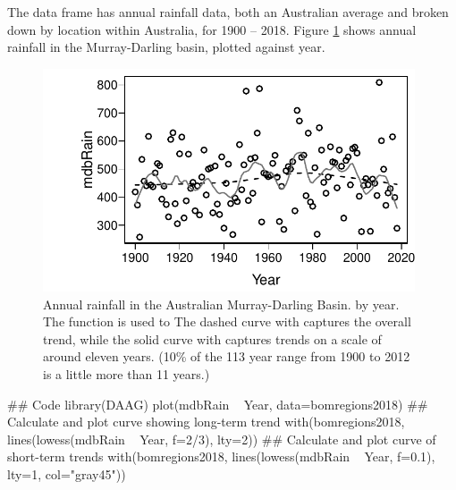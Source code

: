 The data frame  has
annual rainfall data, both an Australian average and broken down by
location within Australia, for 1900 -- 2018.
Figure \ref{fig:mdbRain} shows annual rainfall in the Murray-Darling
basin, plotted against year.

\begin{figure}
\begin{Schunk}


\centerline{\includegraphics[width=0.98\textwidth]{figs/03-MDBrainfall-1} }

\end{Schunk}
\caption{Annual rainfall in the Australian Murray-Darling Basin.
by year.  The  function is used to
The dashed curve with  captures the
overall trend, while the solid curve with 
captures trends on a scale of around eleven years. (10\% of the 113 year
range from 1900 to 2012 is a little more than 11 years.)\label{fig:mdbRain}}
\vspace*{-6pt}
\end{figure}

\begin{fullwidth}

\begin{Schunk}
\begin{Sinput}
## Code
library(DAAG)
plot(mdbRain ~ Year, data=bomregions2018)
## Calculate and plot curve showing long-term trend
with(bomregions2018, lines(lowess(mdbRain ~ Year, f=2/3), lty=2))
## Calculate and plot curve of short-term trends
with(bomregions2018, lines(lowess(mdbRain ~ Year, f=0.1),
                           lty=1, col="gray45"))
\end{Sinput}
\end{Schunk}

\end{fullwidth}


